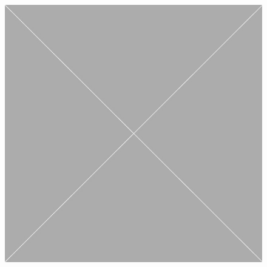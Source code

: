 \documentclass[10pt,oneside]{book}
\begin{document}
\begin{figure}
  \begin{minipage}[t]{0.25\linewidth}
    \mbox{}\\
    \label{fig:blah}
  \end{minipage}
  \hfill
  \begin{minipage}[t]{0.715\linewidth}
    \mbox{}\\
    \includegraphics[width=\linewidth]{Pictures/placeholder.jpg}
  \end{minipage}
\end{figure}
\end{document}
